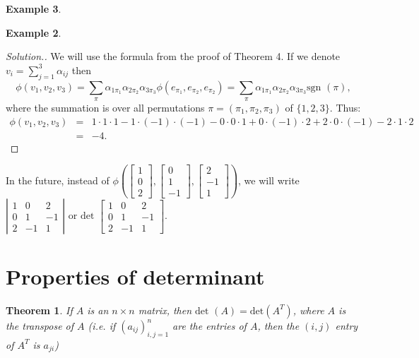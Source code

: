 \documentclass[11pt]{article}
\newtheorem{thm}{Theorem}[section]
\theoremstyle{definition}
\newtheorem{exmp}[thm]{Example}
\theoremstyle{plain}
\begin{document}
\begin{exmp}
\begin{exmp}
\begin{proof}[Solution.]
We will use the formula from the proof of Theorem 4. If we denote \(  v_i=\sum_{j=1}^3 \alpha_{ij} \) then \[ \phi(v_1,v_2,v_3)=\sum_{\pi}\alpha_{1\pi_1}\alpha_{2\pi_2} \alpha_{3\pi_3}\phi\left(e_{\pi_1},e_{\pi_2}, e_{\pi_2}\right)= \sum_{\pi}\alpha_{1\pi_1}\alpha_{2\pi_2} \alpha_{3\pi_3}\mbox{sgn }(\pi) ,\] where the summation is over all permutations \( \pi=(\pi_1,\pi_2,\pi_3) \) of \( \{1,2,3\} \). Thus: \begin{eqnarray*}\phi(v_1, v_2, v_3)&=&1\cdot1\cdot 1-1\cdot (-1)\cdot (-1)-0\cdot 0\cdot 1+0\cdot (-1)\cdot 2+2\cdot 0\cdot (-1)-2\cdot 1\cdot 2\\ &=&-4. \end{eqnarray*}
\end{proof}

In the future, instead of \( \phi\left(\left[\begin{array}{c} 1\\0\\2\end{array}\right], \left[\begin{array}{c} 0\\1\\-1\end{array}\right], \left[\begin{array}{c} 2\\-1\\1\end{array}\right]\right)\), we will write \( \left|\begin{array}{ccc} 1&0&2\\0&1&-1\\2&-1&1\end{array}\right| \) or \( \mbox{det } \left[\begin{array}{ccc} 1&0&2\\0&1&-1\\2&-1&1\end{array} \right]\).

\section{Properties of determinant}
\begin{thm}
If \( A \) is an \( n\times n \) matrix, then \( \mbox{det }(A)=\mbox{det} (A^T) \), where \( A \) is the transpose of \( A \) (i.e. if \( (a_{ij})_{i,j=1}^n \) are the entries of \( A \), then the \( (i,j) \) entry of \( A^T \) is \( a_{ji} \))
\end{thm}


\end{exmp}
\end{exmp}
\end{document}
